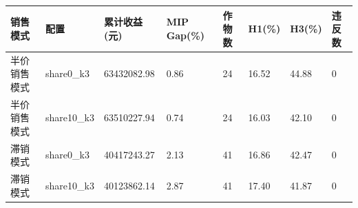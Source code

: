 \begin{tabular}{llllllll}
\toprule
销售模式 & 配置 & 累计收益(元) & MIP Gap(\%) & 作物数 & H1(\%) & H3(\%) & 违反数 \\
\midrule
半价销售模式 & share0\_k3 & 63432082.98 & 0.86 & 24 & 16.52 & 44.88 & 0 \\
半价销售模式 & share10\_k3 & 63510227.94 & 0.74 & 24 & 16.03 & 42.10 & 0 \\
滞销模式 & share0\_k3 & 40417243.27 & 2.13 & 41 & 16.86 & 42.47 & 0 \\
滞销模式 & share10\_k3 & 40123862.14 & 2.87 & 41 & 17.40 & 41.87 & 0 \\
\bottomrule
\end{tabular}
